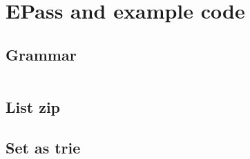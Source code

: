 \documentclass[12pt, openany]{memoir}
\begin{document}
\appendix
\chapter{EPass and example code} 
\section{Grammar} \label{sec:grammar}
\inputminted{text}{code/grammar.txt}
\newpage
\section{List zip} \label{sec:exnzip}


\section{Set as trie} \label{sec:trie}

\backmatter
\printbibliography
\end{document}

